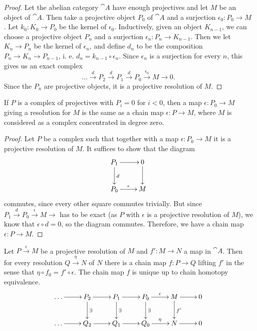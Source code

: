 \begin{proof}
	Let the abelian category $\cat{A}$ have enough projectives and let $M$ be an object of $\cat{A}$.
	Then take a projective object $P_0$ of $\cat{A}$ and a surjection $\epsilon_0:P_0 \rightarrow M$.
	Let $k_0: K_0 \rightarrow P_0$ be the kernel of $\epsilon_0$.
	Inductively, given an object $K_{n-1}$, we can choose a projective object $P_n$ and a surjection $\epsilon_n: P_n \rightarrow K_{n-1}$.
	Then we let $K_n \rightarrow P_n$ be the kernel of $\epsilon_n$, and define $d_n$ to be the composition $P_n \rightarrow K_n \rightarrow P_{n-1}$, i. e. $d_n = k_{n-1}\circ\epsilon_{n}$.
	Since $\epsilon_n$ is a surjection for every $n$, this gives us an exact complex
	\[\dots \overset{d}{\longrightarrow} P_2 \overset{d}{\longrightarrow} P_1 \overset{d}{\longrightarrow} P_0 \overset{\epsilon_0}{\longrightarrow} M \rightarrow 0.\]
	Since the $P_n$ are projective objects, it is a projective resolution of $M$.
\end{proof}

\begin{exercise}
	If $P$ is a complex of projectives with $P_i=0$ for $i<0$, then a map $\epsilon:P_0\rightarrow M$ giving a resolution for $M$ is the same as a chain map $\epsilon:P\rightarrow M$, where $M$ is considered as a complex concentrated in degree zero.
\end{exercise}

\begin{proof}
	Let $P$ be a complex such that together with a map $\epsilon: P_0 \rightarrow M$ it is a projective resolution of $M$.
	It suffices to show that the diagram
	\[
		\xymatrix{
			P_1 \ar[r] \ar[d]^d &0 \ar[d] \\
			P_0 \ar[r]^{\epsilon} &M
		}
	\]
	commutes, since every other square commutes trivially.
	But since $P_1 \overset{d}{\longrightarrow} P_0 \overset{\epsilon}{\longrightarrow} M \rightarrow $ has to be exact (as $P$ with $\epsilon$ is a projective resolution of $M$), we know that $\epsilon\circ d = 0$, so the diagram commutes.
	Therefore, we have a chain map $\epsilon: P \rightarrow M$.
\end{proof}

\begin{theorem}
	Let $P\overset{\epsilon}{\rightarrow} M$ be a projective resolution of $M$ and $f':M\rightarrow N$ a map in $\cat{A}$. Then for every resolution $Q\overset{\eta}{\rightarrow} N$ of $N$ there is a chain map $f:P\rightarrow Q$ lifting $f'$ in the sense that $\eta\circ f_0=f'\circ\epsilon$. The chain map $f$ is unique up to chain homotopy equivalence.
	\begin{align*}
		\xymatrix{
			\dots \ar[r] &P_2 \ar[r] \ar[d]^{\exists} &P_1 \ar[r] \ar[d]^{\exists} &P_0 \ar[r]^{\epsilon} \ar[d]^{\exists} &M \ar[r] \ar[d]^{f'} &0 \\
			\dots \ar[r] &Q_2 \ar[r] &Q_1 \ar[r] &Q_0 \ar[r]^{\eta} &N \ar[r] &0 
		}
	\end{align*}
\end{theorem}

